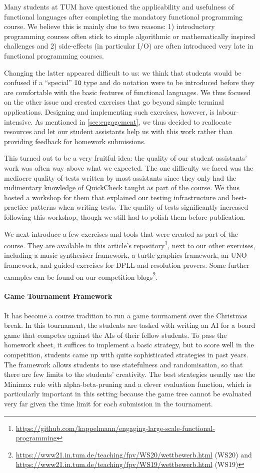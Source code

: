 Many students at TUM have questioned the
applicability and usefulness
of functional languages after completing
the mandatory functional programming course.
We believe this is mainly due to two reasons:
1) introductory programming courses often stick
to simple algorithmic or mathematically inspired challenges and
2) side-effects (in particular I/O)
are often introduced very late
in functional programming courses.

Changing the latter appeared difficult to us:
we think that students would be confused
if a ``special'' \texttt{IO} type and do notation were to
be introduced before they are comfortable
with the basic features of functional
languages.
We thus focused on the other issue
and created exercises that go beyond
simple terminal applications.
Designing and implementing such exercises,
however, is labour-intensive.
As mentioned in \cref{sec:engagement},
we thus decided to reallocate resources and
let our student assistants help us with this work
rather than providing feedback for homework submissions.

This turned out to be a very fruitful idea:
the quality of our student assistants' work was often way above what
we expected.
The one difficulty we faced was the mediocre quality of
tests written by most assistants
since they only had the rudimentary knowledge of QuickCheck taught as part of
the course.
We thus hosted a workshop for them that explained
our testing infrastructure and best-practice
patterns when writing tests.
The quality of tests significantly increased following this workshop,
though we still had to polish them before publication.

We next introduce a few exercises and tools
that were created as part of the course.
They are available in this article's repository\footnote{\url{https://github.com/kappelmann/engaging-large-scale-functional-programming}},
next to our other exercises, including
a music synthesiser framework,
a turtle graphics framework,
an UNO framework,
and guided exercises for DPLL and resolution provers.
Some further examples can be found on our competition blogs\footnote{\url{https://www21.in.tum.de/teaching/fpv/WS20/wettbewerb.html} (WS20) and
\url{https://www21.in.tum.de/teaching/fpv/WS19/wettbewerb.html} (WS19)}.

\paragraph{Game Tournament Framework}
It has become a course tradition to run a game tournament over the Christmas break.
In this tournament, the students are tasked with writing an AI for a board game that competes against the AIs of their fellow students.
To pass the homework sheet, it suffices to implement a basic strategy, but to score well in the competition, students came up with quite sophisticated strategies in past years.
The framework allows students to use statefulness and randomisation, so that there are few limits to the students' creativity.
The best strategies usually use the Minimax rule with alpha-beta-pruning and a clever evaluation function, which is particularly important in this setting because the game tree cannot be evaluated very far given the time limit for each submission in the tournament.

